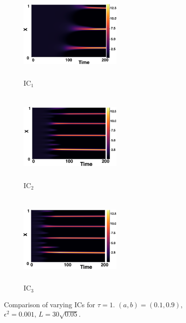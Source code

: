 \begin{figure}[H]
    \centering
    \begin{subfigure}[b]{0.32\textwidth}
        \centering
        \includegraphics[width=5cm,height=4.5cm]{gaff1.png}
        \caption{$\text{IC}_1$}
        \label{}
    \end{subfigure}
    \hfill
    \begin{subfigure}[b]{0.32\textwidth}
        \centering
        \includegraphics[width=5cm,height=4.5cm]{ic21.png}
        \caption{$\text{IC}_2$}
        \label{}
    \end{subfigure}
    \hfill
    \begin{subfigure}[b]{0.32\textwidth}
        \centering
        \includegraphics[width=5cm,height=4.5cm]{ic31.png}
        \caption{$\text{IC}_3$}
        \label{}
    \end{subfigure}
    \caption{Comparison of varying ICs for $\tau=1$. $(a,b)=(0.1,0.9)$, $\epsilon^2=0.001$, $L=30\sqrt{0.05}$.}
    \label{fig:figtau1}
\end{figure}
